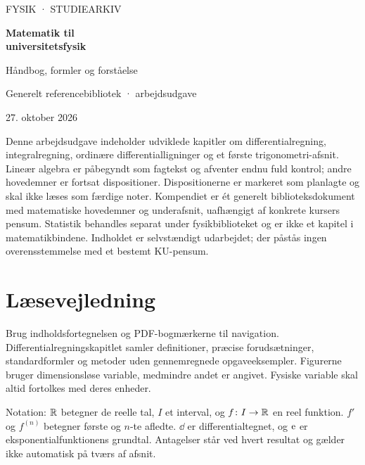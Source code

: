 \documentclass[11pt,a4paper,oneside]{book}
\begin{document}
\frontmatter
\begin{titlepage}
\centering
\vspace*{28mm}
{\sffamily\color{arkivblaa}\Large FYSIK · STUDIEARKIV\par}
\vspace{16mm}
{\Huge\bfseries Matematik til\\[5mm]universitetsfysik\par}
\vspace{12mm}
{\Large Håndbog, formler og forståelse\par}
\vfill
{\large Generelt referencebibliotek · arbejdsudgave\par}
\vspace{4mm}
{\large 27. oktober 2026\par}
\vspace{14mm}
\begin{minipage}{0.83\textwidth}
Denne arbejdsudgave indeholder udviklede kapitler om differentialregning, integralregning, ordinære differentialligninger og et første trigonometri-afsnit. Lineær algebra er påbegyndt som fagtekst og afventer endnu fuld kontrol; andre hovedemner er fortsat dispositioner. Dispositionerne er markeret som planlagte og skal ikke læses som færdige noter. Kompendiet er ét generelt biblioteksdokument med matematiske hovedemner og underafsnit, uafhængigt af konkrete kursers pensum. Statistik behandles separat under fysikbiblioteket og er ikke et kapitel i matematikbindene. Indholdet er selvstændigt udarbejdet; der påstås ingen overensstemmelse med et bestemt KU-pensum.
\end{minipage}
\end{titlepage}
\chapter*{Læsevejledning}
Brug indholdsfortegnelsen og PDF-bogmærkerne til navigation. Differentialregningskapitlet samler definitioner, præcise forudsætninger, standardformler og metoder uden gennemregnede opgaveeksempler. Figurerne bruger dimensionsløse variable, medmindre andet er angivet. Fysiske variable skal altid fortolkes med deres enheder.

Notation: $\mathbb{R}$ betegner de reelle tal, $I$ et interval, og $f\colon I\to\mathbb{R}$ en reel funktion. $f'$ og $f^{(n)}$ betegner første og $n$-te afledte. $\dd$ er differentialtegnet, og $\mathrm{e}$ er eksponentialfunktionens grundtal. Antagelser står ved hvert resultat og gælder ikke automatisk på tværs af afsnit.
\end{document}
